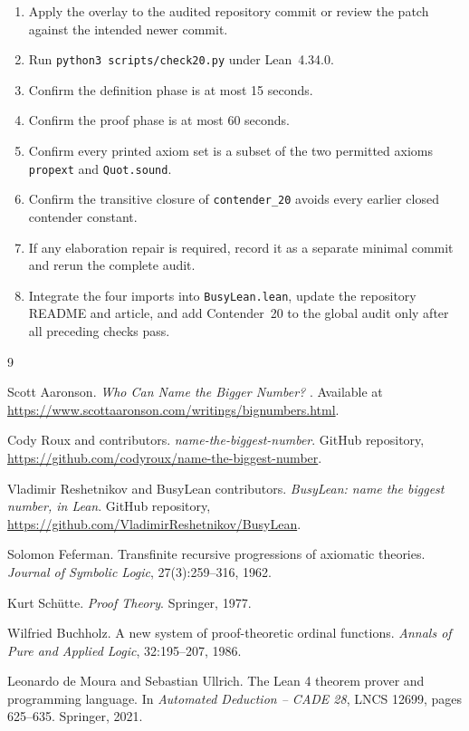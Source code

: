 \documentclass[11pt]{article}
\theoremstyle{definition}
\theoremstyle{remark}
\newcommand{\leanname}[1]{\nolinkurl{#1}}
\begin{document}
\begin{enumerate}[leftmargin=*,label=\(\square\)]
\item Apply the overlay to the audited repository commit or review the patch
  against the intended newer commit.
\item Run \leanname{python3 scripts/check20.py} under Lean~4.34.0.
\item Confirm the definition phase is at most 15 seconds.
\item Confirm the proof phase is at most 60 seconds.
\item Confirm every printed axiom set is a subset of the two permitted axioms
  \leanname{propext} and \leanname{Quot.sound}.
\item Confirm the transitive closure of \leanname{contender_20} avoids every
  earlier closed contender constant.
\item If any elaboration repair is required, record it as a separate minimal
  commit and rerun the complete audit.
\item Integrate the four imports into \leanname{BusyLean.lean}, update the
  repository README and article, and add Contender~20 to the global audit only
  after all preceding checks pass.
\end{enumerate}

\begin{thebibliography}{9}

Scott Aaronson.
\newblock \emph{Who Can Name the Bigger Number?}
.  Available at
\url{https://www.scottaaronson.com/writings/bignumbers.html}.

Cody Roux and contributors.
\newblock \emph{name-the-biggest-number}.
\newblock GitHub repository,
\url{https://github.com/codyroux/name-the-biggest-number}.

Vladimir Reshetnikov and BusyLean contributors.
\newblock \emph{BusyLean: name the biggest number, in Lean}.
\newblock GitHub repository,
\url{https://github.com/VladimirReshetnikov/BusyLean}.

Solomon Feferman.
\newblock Transfinite recursive progressions of axiomatic theories.
\newblock \emph{Journal of Symbolic Logic}, 27(3):259--316, 1962.

Kurt Sch\"utte.
\newblock \emph{Proof Theory}.
\newblock Springer, 1977.

Wilfried Buchholz.
\newblock A new system of proof-theoretic ordinal functions.
\newblock \emph{Annals of Pure and Applied Logic}, 32:195--207, 1986.

Leonardo de Moura and Sebastian Ullrich.
\newblock The Lean 4 theorem prover and programming language.
\newblock In \emph{Automated Deduction -- CADE 28}, LNCS 12699,
pages 625--635. Springer, 2021.

\end{thebibliography}
\end{document}
